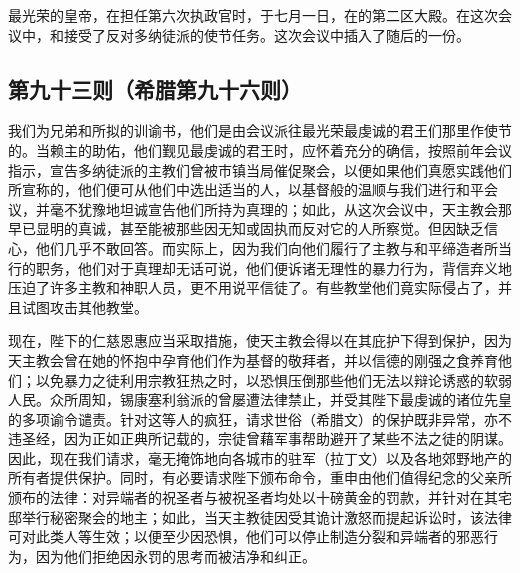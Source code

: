 最光荣的皇帝，在担任第六次执政官时，于七月一日，在的第二区大殿。在这次会议中，和接受了反对多纳徒派的使节任务。这次会议中插入了随后的一份。\par


\subsection{第九十三则（希腊第九十六则）}

\par

我们为兄弟和所拟的训谕书，他们是由会议派往最光荣最虔诚的君王们那里作使节的。当赖主的助佑，他们觐见最虔诚的君王时，应怀着充分的确信，按照前年会议指示，宣告多纳徒派的主教们曾被市镇当局催促聚会，以便如果他们真愿实践他们所宣称的，他们便可从他们中选出适当的人，以基督般的温顺与我们进行和平会议，并毫不犹豫地坦诚宣告他们所持为真理的；如此，从这次会议中，天主教会那早已显明的真诚，甚至能被那些因无知或固执而反对它的人所察觉。但因缺乏信心，他们几乎不敢回答。而实际上，因为我们向他们履行了主教与和平缔造者所当行的职务，他们对于真理却无话可说，他们便诉诸无理性的暴力行为，背信弃义地压迫了许多主教和神职人员，更不用说平信徒了。有些教堂他们竟实际侵占了，并且试图攻击其他教堂。\par

现在，陛下的仁慈恩惠应当采取措施，使天主教会得以在其庇护下得到保护，因为天主教会曾在她的怀抱中孕育他们作为基督的敬拜者，并以信德的刚强之食养育他们；以免暴力之徒利用宗教狂热之时，以恐惧压倒那些他们无法以辩论诱惑的软弱人民。众所周知，锡康塞利翁派的曾屡遭法律禁止，并受其陛下最虔诚的诸位先皇的多项谕令谴责。针对这等人的疯狂，请求世俗（希腊文）的保护既非异常，亦不违圣经，因为正如正典所记载的，宗徒曾藉军事帮助避开了某些不法之徒的阴谋。因此，现在我们请求，毫无掩饰地向各城市的驻军（拉丁文）以及各地郊野地产的所有者提供保护。同时，有必要请求陛下颁布命令，重申由他们值得纪念的父亲所颁布的法律：对异端者的祝圣者与被祝圣者均处以十磅黄金的罚款，并针对在其宅邸举行秘密聚会的地主；如此，当天主教徒因受其诡计激怒而提起诉讼时，该法律可对此类人等生效；以便至少因恐惧，他们可以停止制造分裂和异端者的邪恶行为，因为他们拒绝因永罚的思考而被洁净和纠正。\par

